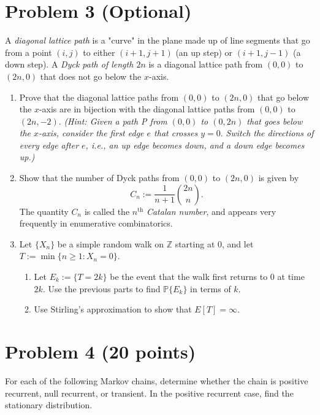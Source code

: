 \documentclass[11pt]{article}
\begin{document}
\section*{Problem 3 (Optional)}
A \textit{diagonal lattice path} is a "curve" in the plane made up of line segments that go from a point \((i,j)\) to either \((i+1,j+1)\) (an up step) or \((i+1,j-1)\) (a down step). A \textit{Dyck path of length \(2n\)} is a diagonal lattice path from \((0,0)\) to \((2n,0)\) that does not go below the \(x\)-axis.

\begin{enumerate}[label=(\alph*)]
    \item Prove that the diagonal lattice paths from \((0,0)\) to \((2n,0)\) that go below the \(x\)-axis are in bijection with the diagonal lattice paths from \((0,0)\) to \((2n,-2)\). \textit{(Hint: Given a path P from \((0,0)\) to \((0,2n)\) that goes below the \(x\)-axis, consider the first edge \(e\) that crosses \(y=0.\) Switch the directions of every edge after \(e\), i.e., an up edge becomes down, and a down edge becomes up.)}
    
    \item Show that the number of Dyck paths from \((0,0)\) to \((2n,0)\) is given by
    \[
    C_{n}:=\frac{1}{n+1}\binom{2n}{n}.
    \]
    The quantity \(C_{n}\) is called the \(n^{\text{th}}\) \textit{Catalan number}, and appears very frequently in enumerative combinatorics.
    
    \item Let \(\{X_{n}\}\) be a simple random walk on \(\mathbb{Z}\) starting at \(0\), and let \(T:=\min\{n\geq 1:X_{n}=0\}\).
    \begin{enumerate}[label=(\roman*)]
        \item Let \(E_{k}:=\{T=2k\}\) be the event that the walk first returns to \(0\) at time \(2k\). Use the previous parts to find \(\mathbb{P}\{E_{k}\}\) in terms of \(k\).
        \item Use Stirling's approximation to show that \(E[T]=\infty\).
    \end{enumerate}
\end{enumerate}

\section*{Problem 4 (20 points)}
For each of the following Markov chains, determine whether the chain is positive recurrent, null recurrent, or transient. In the positive recurrent case, find the stationary distribution.
\end{document}
